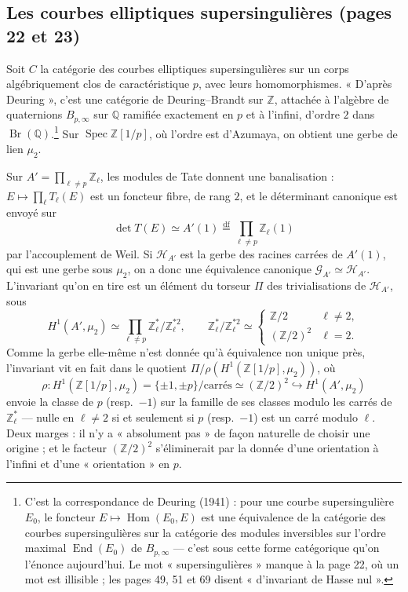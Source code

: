 \documentclass[11pt,a4paper]{article}
\begin{document}
\subsection*{Les courbes elliptiques supersingulières (pages 22 et 23)}

Soit $C$ la catégorie des courbes elliptiques supersingulières sur un corps
algébriquement clos de caractéristique $p$, avec leurs homomorphismes.
« D'après Deuring », c'est une catégorie de Deuring--Brandt sur $\mathbb{Z}$,
attachée à l'algèbre de quaternions $B_{p,\infty}$ sur $\mathbb{Q}$ ramifiée
exactement en $p$ et à l'infini, d'ordre $2$ dans
$\operatorname{Br}(\mathbb{Q})$.\footnote{C'est la correspondance de Deuring
(1941) : pour une courbe supersingulière $E_{0}$, le foncteur $E \mapsto
\operatorname{Hom}(E_{0}, E)$ est une équivalence de la catégorie des courbes
supersingulières sur la catégorie des modules inversibles sur l'ordre maximal
$\operatorname{End}(E_{0})$ de $B_{p,\infty}$ --- c'est sous cette forme
catégorique qu'on l'énonce aujourd'hui. Le mot « supersingulières » manque à
la page 22, où un mot est illisible ; les pages 49, 51 et 69 disent « d'invariant
de Hasse nul ».} Sur $\operatorname{Spec} \mathbb{Z}[1/p]$, où l'ordre est
d'Azumaya, on obtient une gerbe de lien $\mu_{2}$.

Sur $A' = \prod_{\ell \neq p} \mathbb{Z}_{\ell}$, les modules de Tate donnent
une banalisation : $E \mapsto \prod_{\ell} T_{\ell}(E)$ est un foncteur fibre, de
rang $2$, et le déterminant canonique est envoyé sur
\[
  \det T(E) \simeq A'(1) \overset{\mathrm{df}}{=} \prod_{\ell \neq p}
  \mathbb{Z}_{\ell}(1)
\]
par l'accouplement de Weil. Si $\mathcal{H}_{A'}$ est la gerbe des racines
carrées de $A'(1)$, qui est une gerbe sous $\mu_{2}$, on a donc une équivalence
canonique $\mathcal{G}_{A'} \simeq \mathcal{H}_{A'}$. L'invariant qu'on en tire
est un élément du torseur $\Pi$ des trivialisations de $\mathcal{H}_{A'}$, sous
\[
  H^{1}(A', \mu_{2}) \simeq \prod_{\ell \neq p}
  \mathbb{Z}_{\ell}^{*}/\mathbb{Z}_{\ell}^{*2} , \qquad
  \mathbb{Z}_{\ell}^{*}/\mathbb{Z}_{\ell}^{*2} \simeq
  \begin{cases} \mathbb{Z}/2 & \ell \neq 2, \\ (\mathbb{Z}/2)^{2} & \ell = 2 .
  \end{cases}
\]
Comme la gerbe elle-même n'est donnée qu'à équivalence non unique près,
l'invariant vit en fait dans le quotient $\Pi/\rho(H^{1}(\mathbb{Z}[1/p],
\mu_{2}))$, où
\[
  \rho \colon H^{1}(\mathbb{Z}[1/p], \mu_{2}) = \{\pm 1, \pm p\}/\text{carrés}
  \simeq (\mathbb{Z}/2)^{2} \hookrightarrow H^{1}(A', \mu_{2})
\]
envoie la classe de $p$ (resp.\ $-1$) sur la famille de ses classes modulo les
carrés de $\mathbb{Z}_{\ell}^{*}$ --- nulle en $\ell \neq 2$ si et seulement si
$p$ (resp.\ $-1$) est un carré modulo $\ell$. Deux marges : il n'y a « absolument
pas » de façon naturelle de choisir une origine ; et le facteur
$(\mathbb{Z}/2)^{2}$ s'éliminerait par la donnée d'une orientation à l'infini
et d'une « orientation » en $p$.
\end{document}
